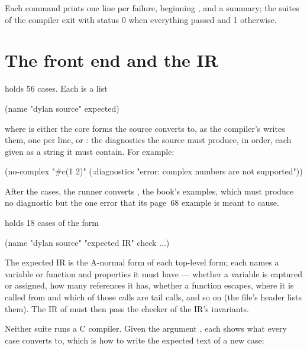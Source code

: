Each command prints one line per failure, beginning , and a
summary; the suites of the compiler exit with status 0 when everything
passed and 1 otherwise.

\section{The front end and the IR}\label{sec:test-front-ir}

 holds 56 cases. Each is a list

\begin{lisp}
(name "dylan source" expected)
\end{lisp}

\noindent where  is either the core forms the source
converts to, as the compiler's  writes them, one per line,
or : the diagnostics the source must
produce, in order, each given as a string it must contain. For example:

\begin{lisp}
 (no-complex
  "#c(1 2)"
  (:diagnostics "error: complex numbers are not supported"))
\end{lisp}

After the cases, the runner converts , the
book's examples, which must produce no diagnostic but the one error that
its page~68 example is meant to cause.

 holds 18 cases of the form

\begin{lisp}
(name "dylan source" "expected IR" check ...)
\end{lisp}

\noindent The expected IR is the A-normal form of each top-level form;
each  names a variable or function and properties it must
have --- whether a variable is captured or assigned, how many references
it has, whether a function escapes, where it is called from and which of
those calls are tail calls, and so on (the file's header lists them).
The IR of  must then pass the checker of the
IR's invariants.

Neither suite runs a C compiler. Given the argument
, each shows what every case converts to, which is how to
write the expected text of a new case:


